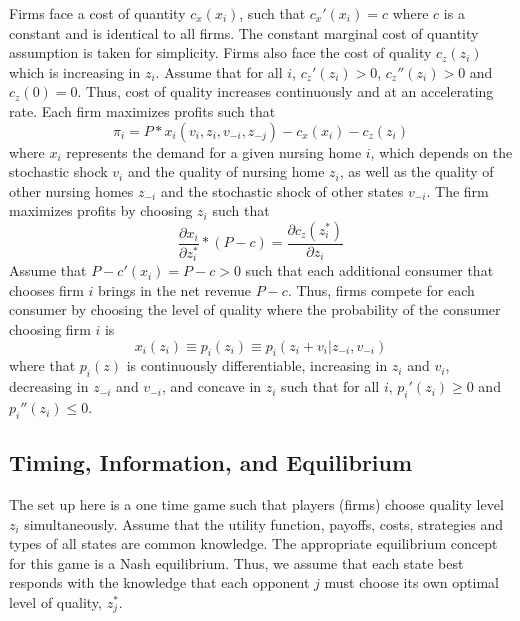 \documentclass[../Main.tex]{subfiles}
\begin{document}
Firms face a cost of quantity $c_x(x_i)$, such that $c_x'(x_i)=c$ where $c$ is a constant and is identical to all firms. The constant marginal cost of quantity assumption is taken for simplicity. Firms also face the cost of quality $c_z(z_i) $ which is increasing in $z_i$. Assume that for all $i$, $c_z'(z_i)>0$, $c_z''(z_i)>0$ and $c_z(0)=0$. Thus, cost of quality increases continuously and at an accelerating rate. Each firm maximizes profits such that \begin{equation}\pi_i = P*x_i(v_i, z_i, v_{-i}, z_{-j}) -c_x(x_i) -c_z(z_i) \end{equation} 
where $x_i$ represents the demand for a given nursing home $i$, which depends on the stochastic shock $v_i$ and the quality of nursing home $z_i$, as well as the quality of other nursing homes $z_{-i}$ and the stochastic shock of other states $v_{-i}$. The firm maximizes profits by choosing $z_i$ such that \begin{equation} \frac{\partial x_i}{\partial z_i^*}*(P-c)= \frac{\partial c_z(z_i^*)}{\partial z_i} \end{equation} Assume that $P - c'(x_i)= P - c > 0$ such that each additional consumer that chooses firm $i$ brings in the net revenue $P - c$. Thus, firms compete for each consumer by choosing the level of quality where the probability of the consumer choosing firm $i$ is \begin{equation} x_{i}(z_i) \equiv p_i(z_i) \equiv p_i(z_i + v_i |z_{-i}, v_{-i}) \end{equation}
where that $p_{i}(z)$ is continuously differentiable, increasing in $z_i$ and $v_i$, decreasing in $z_{-i}$ and $v_{-i}$, and concave in $z_i$ such that for all $i$, $p_{i}'(z_i)\geq 0$ and $p_{i}''(z_i) \leq 0$.

\subsection{Timing, Information, and Equilibrium}
The set up here is a one time game such that players (firms) choose quality level $z_i$ simultaneously. Assume that the utility function, payoffs, costs, strategies and types of all states are common knowledge. The appropriate equilibrium concept for this game is a Nash equilibrium. Thus, we assume that each state best responds with the knowledge that each opponent $j$ must choose its own optimal level of quality, $z_j^*$.
\end{document}
